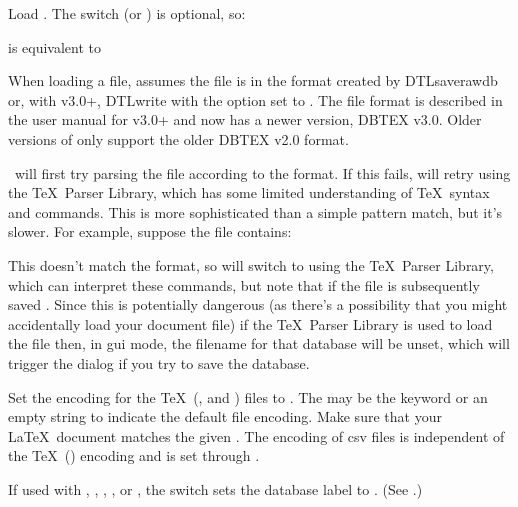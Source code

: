 Load . The switch 
(or ) is optional, so:
\begin{terminal}
 
\end{terminal}
is equivalent to 
\begin{terminal}
  
\end{terminal}

When loading a  file,  assumes the
 file is in the format created by \gls{DTLsaverawdb} or,
with  v3.0+, \gls{DTLwrite} with the  option
set to . The file format is described in the user
manual for  v3.0+ and now has a newer version, 
DBTEX v3.0. Older versions of  only support the
older DBTEX v2.0 format.

\appname\ will first try parsing the file according to the  format. 
If this fails, 
will retry using the \TeX\ Parser Library, which has some limited
understanding of \TeX\ syntax and  commands.
This is more sophisticated than a simple pattern match, but it's slower.
For example, suppose the file contains:

This doesn't match the  format, so  will
switch to using the \TeX\ Parser Library, which can interpret these
commands, but note that if the file is subsequently saved
. Since this is
potentially dangerous (as there's a possibility that you might
accidentally load your document  file) if the 
\TeX\ Parser Library is used to load the file then, in \gls{gui}
mode, the filename for that database will be unset, which will 
trigger the  dialog if you try to save the database.

Set the encoding for the \TeX\ (,  and ) files to 
. The  may
be the keyword  or an empty string to
indicate the default file encoding. Make sure that your \LaTeX\
document matches the given . The encoding of 
\gls{csv} files is independent of the \TeX\ () 
encoding and is set through .

If used with , , , , 
or \switch{probsoln}, the \switch{name} switch sets the database label to 
\meta{name}. (See \sectionref{fileext}.)

